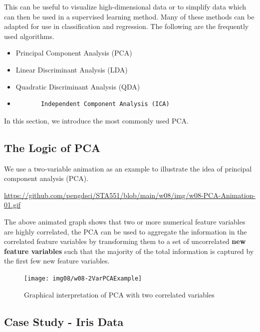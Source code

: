 \documentclass[
]{book}
\begin{document}
This can be useful to visualize high-dimensional data or to simplify data which can then be used in a supervised learning method. Many of these methods can be adapted for use in classification and regression. The following are the frequently used algorithms.

\begin{itemize}
\item
  Principal Component Analysis (PCA)
\item
  Linear Discriminant Analysis (LDA)
\item
  Quadratic Discriminant Analysis (QDA)
\item
\begin{verbatim}
       Independent Component Analysis (ICA)
\end{verbatim}
\end{itemize}

In this section, we introduce the most commonly used PCA.

\hypertarget{the-logic-of-pca}{%
\subsection{The Logic of PCA}\label{the-logic-of-pca}}

We use a two-variable animation as an example to illustrate the idea of principal component analysis (PCA).

\url{https://github.com/pengdsci/STA551/blob/main/w08/img/w08-PCA-Animation-01.gif}

The above animated graph shows that two or more numerical feature variables are highly correlated, the PCA can be used to aggregate the information in the correlated feature variables by transforming them to a set of uncorrelated \textbf{new feature variables} such that the majority of the total information is captured by the first few new feature variables.

\begin{figure}

{\centering \texttt{[image: img08/w08-2VarPCAExample]} 

}

\caption{Graphical interpretation of PCA with two correlated variables}\label{fig:unnamed-chunk-212}
\end{figure}

\hypertarget{case-study---iris-data}{%
\subsection{Case Study - Iris Data}\label{case-study---iris-data}}
\end{document}
